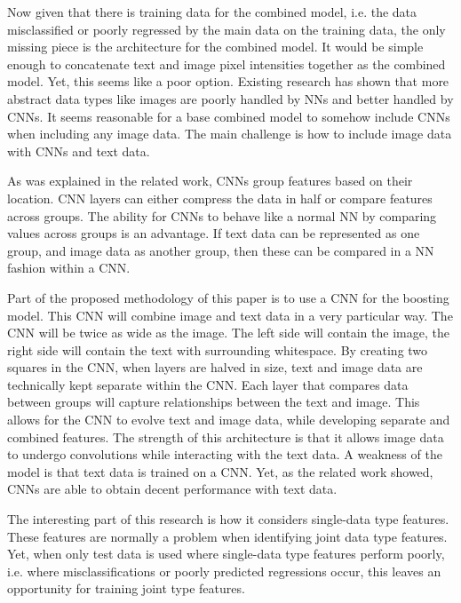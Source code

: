 Now given that there is training data for the combined model, i.e. the data misclassified or poorly regressed by the main data on the training data, the only missing piece is the architecture for the combined model.  It would be simple enough to concatenate text and image pixel intensities together as the combined model.  Yet, this seems like a poor option.  Existing research has shown that more abstract data types like images are poorly handled by NNs and better handled by CNNs.  It seems reasonable for a base combined model to somehow include CNNs when including any image data.  The main challenge is how to include image data with CNNs and text data.

As was explained in the related work, CNNs group features based on their location.  CNN layers can either compress the data in half or compare features across groups.  The ability for CNNs to behave like a normal NN by comparing values across groups is an advantage.  If text data can be represented as one group, and image data as another group, then these can be compared in a NN fashion within a CNN.

Part of the proposed methodology of this paper is to use a CNN for the boosting model.  This CNN will combine image and text data in a very particular way.  The CNN will be twice as wide as the image.  The left side will contain the image, the right side will contain the text with surrounding whitespace. By creating two squares in the CNN, when layers are halved in size, text and image data are technically kept separate within the CNN.  Each layer that compares data between groups will capture relationships between the text and image.  This allows for the CNN to evolve text and image data, while developing separate and combined features. The strength of this architecture is that it allows image data to undergo convolutions while interacting with the text data.  A weakness of the model is that text data is trained on a CNN.  Yet, as the related work showed, CNNs are able to obtain decent performance with text data.

The interesting part of this research is how it considers single-data type features.  These features are normally a problem when identifying joint data type features.  Yet, when only test data is used where single-data type features perform poorly, i.e. where misclassifications or poorly predicted regressions occur, this leaves an opportunity for training joint type features.





